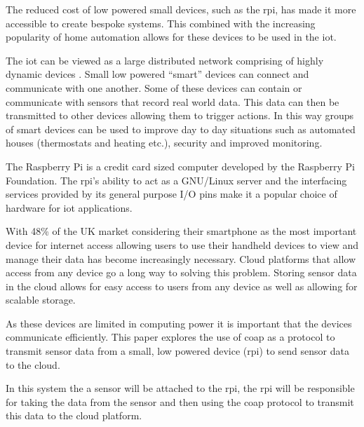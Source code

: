 The reduced cost of low powered small devices, such as the \gls{rpi}, has made it 
more accessible to create bespoke systems. 
This combined with the increasing popularity of home automation allows for these 
devices to be used in the \gls{iot}.

The \gls{iot} can be viewed as a large distributed network comprising of highly 
dynamic devices \citep{miorandi_internet_2012}. Small low powered ``smart'' devices 
can connect and communicate with one another. Some of these devices can contain or 
communicate with sensors that record real world data. This data can then be 
transmitted to other devices allowing them to trigger actions. In this way groups 
of smart devices can be used to improve day to day situations such as automated 
houses (thermostats and heating etc.), security and improved monitoring.

The Raspberry Pi \citep{pi_model_2018} is a credit card sized computer developed 
by the Raspberry Pi Foundation. 
The \gls{rpi}'s ability to act as a GNU/Linux server and the interfacing services 
provided by its general purpose I/O pins make it a popular 
choice of hardware for \gls{iot} applications. \citep{kumar_iot_2016}

With 48\% of the UK market considering their smartphone as the most important 
device for internet access \citep{ofcom_communications_2018} allowing users to use 
their handheld devices to view and manage their data has become increasingly 
necessary. Cloud platforms that allow access from any device go a long way to 
solving this problem. Storing sensor data in the cloud allows for easy access to 
users from any device as well as allowing for scalable storage.

As these devices are limited in computing power it is important that the devices 
communicate efficiently. 
This paper explores the use of \gls{coap} as a protocol to transmit sensor data 
from a small, low powered device (\gls{rpi}) to send sensor data to the cloud.

In this system the a sensor will be attached to the \gls{rpi}, the \gls{rpi} will 
be responsible for taking the data from the sensor and then 
using the \gls{coap} protocol to transmit this data to the cloud platform.